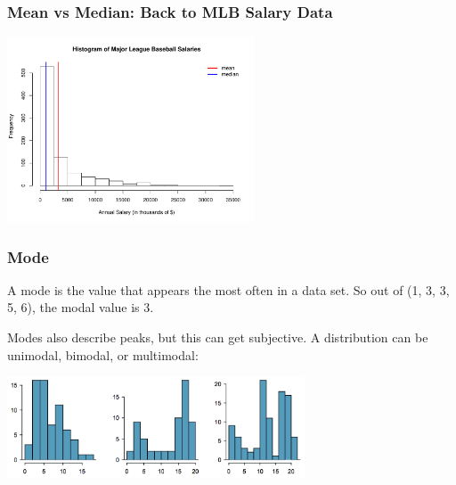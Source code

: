\documentclass[handout]{beamer}
\newcommand{\blue}[1]{\textcolor{blue2}{#1}}
\begin{document}
\begin{frame}
\frametitle{Mean vs Median: Back to MLB Salary Data}

\begin{center}
\includegraphics[height=5.5cm]{figure/MLB2.pdf}
\end{center}

\end{frame}


\begin{frame}[fragile]
\frametitle{Mode}
A \blue{mode} is the value that appears the most often in a data set.  So out of (1, 3, 3, 5, 6), the modal value is 3.  

\vspace{0.25cm}

\pause Modes also describe \blue{peaks}, but this can get subjective. A distribution can be \blue{unimodal}, \blue{bimodal}, or \blue{multimodal}:

\begin{center}
\includegraphics[height=3cm]{figure/modes.png}
\end{center}

\end{frame}
\end{document}
